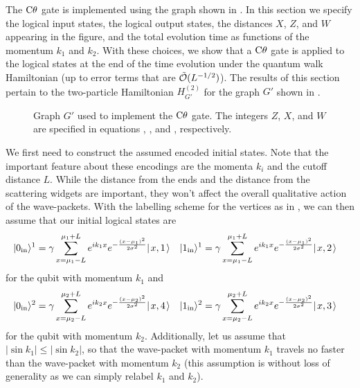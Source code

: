 \documentclass[../thesis-main/thesis-main]{subfiles}
\begin{document}
The $\mathrm{C}\theta$ gate is implemented using the graph shown in . In this section we specify the logical input states, the logical output states, the distances $X$, $Z$, and $W$ appearing in the figure, and the total evolution time as functions of the momentum $k_{1}$ and $k_{2}$. With these choices, we show that a $\mathrm{C}\theta$ gate is applied to the logical states at the end of the time evolution under the quantum walk Hamiltonian (up to error terms that are $\tilde{\mathcal{O}}(L^{-{1}/{2}})$). The results of this section pertain to the two-particle Hamiltonian $H^{(2)}_{G'}$ for the graph $G'$ shown in .

\begin{figure}
  \centering
   
  \caption{Graph $G'$ used to implement the $\mathrm{C}\theta$ gate. The integers $Z$, $X$, and $W$ are specified in equations , , and , respectively.}
\label{fig:explicit_cd}
\end{figure}

We first need to construct the assumed encoded initial states.  Note that the important feature about these encodings are the momenta $k_i$ and  the cutoff distance $L$.  While the distance from the ends and the distance from the scattering widgets are important, they won't affect the overall qualitative action of the wave-packets.  With the labelling scheme for the vertices as in , we can then assume that our initial logical states are
\begin{align}
  |0_{\text{in}}\rangle^{1}&=  \gamma \sum_{x = \mu_1 -L} ^{\mu_1 + L}  e^{i k_{1} x} e^{- \frac{(x-\mu_1)^2}{2\sigma^2}} |\mspace{2mu} x,1 \mspace{2mu} \rangle & 
  |1_\text{in}\rangle^1&= \gamma \sum_{x = \mu_1 -L} ^{\mu_1 + L}  e^{i k_{1} x} e^{- \frac{(x-\mu_1)^2}{2\sigma^2}} |\mspace{2mu} x,2 \mspace{2mu} \rangle \label{eq:cd_input_1}
\end{align}
for the qubit with momentum $k_1$ and
\begin{align}
  |0_{\text{in}}\rangle^2&=\gamma \sum_{x = \mu_2 -L} ^{\mu_2 + L}  e^{i k_{2} x} e^{- \frac{(x-\mu_2)^2}{2\sigma^2}} |\mspace{2mu} x,4 \mspace{2mu} \rangle&
  |1_\text{in}\rangle^2&=\gamma \sum_{x = \mu_2 -L} ^{\mu_2 + L}  e^{i k_{2} x} e^{- \frac{(x-\mu_2)^2}{2\sigma^2}} |\mspace{2mu} x,3 \mspace{2mu} \rangle \label{eq:cd_input_2}
\end{align}
 for the qubit with momentum $k_2$.  Additionally, let us assume that $|\sin k_1| \leq |\sin k_2|$, so that the wave-packet with momentum $k_1$ travels no faster than the wave-packet with momentum $k_2$ (this assumption is without loss of generality as we can simply relabel $k_1$ and $k_2$).
 
\end{document}

